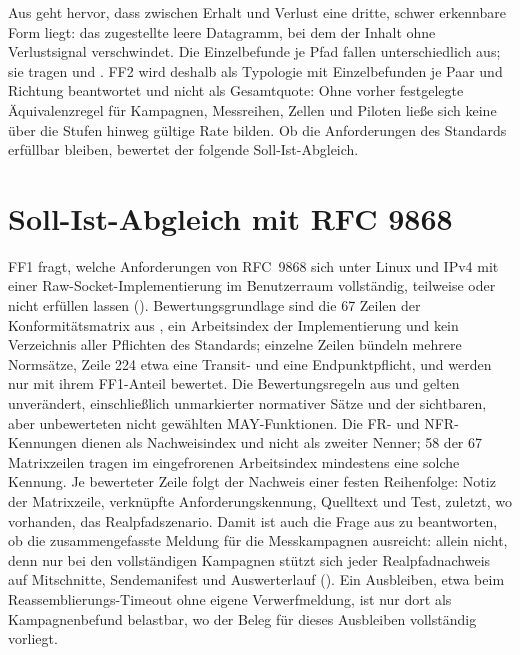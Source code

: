 Aus  geht hervor, dass zwischen Erhalt und Verlust eine dritte, schwer
erkennbare Form liegt: das zugestellte leere Datagramm, bei dem der Inhalt ohne Verlustsignal
verschwindet. Die Einzelbefunde je Pfad fallen unterschiedlich aus; sie tragen 
und . FF2 wird deshalb als Typologie mit Einzelbefunden je Paar und
Richtung beantwortet und nicht als Gesamtquote: Ohne vorher festgelegte Äquivalenzregel für Kampagnen,
Messreihen, Zellen und Piloten ließe sich keine über die Stufen hinweg gültige Rate bilden. Ob die
Anforderungen des Standards erfüllbar bleiben, bewertet der folgende Soll-Ist-Abgleich.

\section{Soll-Ist-Abgleich mit RFC 9868}
\label{sec:soll-ist}

FF1 fragt, welche Anforderungen von RFC~9868 sich unter Linux und IPv4 mit einer
Raw-Socket-Implementierung im Benutzerraum vollständig, teilweise oder nicht erfüllen lassen
(). Bewertungsgrundlage sind die 67 Zeilen der Konformitäts\-matrix aus
, ein Arbeitsindex der Implementierung und kein Verzeichnis
aller Pflichten des Standards; einzelne Zeilen bündeln mehrere Normsätze, Zeile 224 etwa eine Transit-
und eine Endpunktpflicht, und werden nur mit ihrem FF1-Anteil bewertet. Die Bewertungsregeln aus
 und  gelten unverändert, einschließlich unmarkierter
normativer Sätze und der sichtbaren, aber unbewerteten nicht gewählten MAY-Funktionen. Die FR- und
NFR-Kennungen dienen als Nachweisindex und nicht als zweiter Nenner; 58 der 67 Matrixzeilen tragen im
eingefrorenen Arbeitsindex mindestens eine solche Kennung. Je bewerteter Zeile folgt der
Nachweis einer festen Reihenfolge: Notiz der Matrixzeile, verknüpfte Anforderungs\-kennung, Quelltext und
Test, zuletzt, wo vorhanden, das Realpfad\-szenario. Damit ist auch die Frage aus 
zu beantworten, ob die zusammengefasste Meldung  für die Messkampagnen
ausreicht: allein nicht, denn nur bei den vollständigen Kampagnen stützt sich jeder Realpfadnachweis
auf Mitschnitte, Sendemanifest und Auswerterlauf (). Ein Ausbleiben, etwa beim
Reassemblierungs-Timeout ohne eigene Verwerfmeldung, ist nur dort als Kampagnen\-befund belastbar, wo
der Beleg für dieses Ausbleiben vollständig vorliegt.

